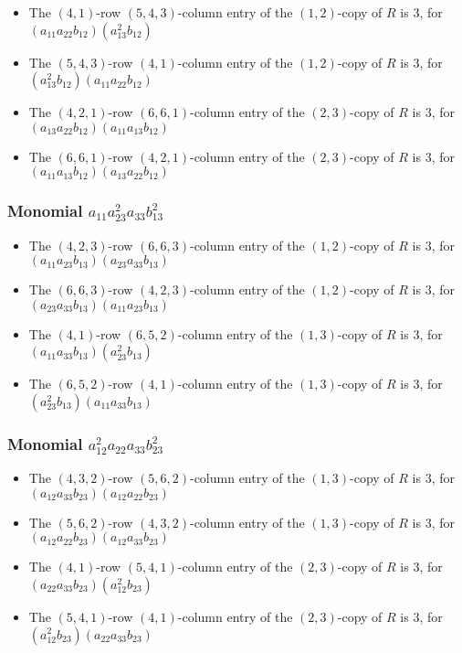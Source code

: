 \documentclass{article}
\begin{document}
\begin{itemize}
\item The $(4, 1)$-row $(5, 4, 3)$-column entry of the $ \left(1, 2\right) $-copy of $R$ is $ 3 $, for $( a_{11} a_{22} b_{12} )( a_{13}^{2} b_{12} )$ 
\item The $(5, 4, 3)$-row $(4, 1)$-column entry of the $ \left(1, 2\right) $-copy of $R$ is $ 3 $, for $( a_{13}^{2} b_{12} )( a_{11} a_{22} b_{12} )$ 
\item The $(4, 2, 1)$-row $(6, 6, 1)$-column entry of the $ \left(2, 3\right) $-copy of $R$ is $ 3 $, for $( a_{13} a_{22} b_{12} )( a_{11} a_{13} b_{12} )$ 
\item The $(6, 6, 1)$-row $(4, 2, 1)$-column entry of the $ \left(2, 3\right) $-copy of $R$ is $ 3 $, for $( a_{11} a_{13} b_{12} )( a_{13} a_{22} b_{12} )$ 
\end{itemize}
\subsubsection{Monomial $ a_{11} a_{23}^{2} a_{33} b_{13}^{2} $}

\begin{itemize}
\item The $(4, 2, 3)$-row $(6, 6, 3)$-column entry of the $ \left(1, 2\right) $-copy of $R$ is $ 3 $, for $( a_{11} a_{23} b_{13} )( a_{23} a_{33} b_{13} )$ 
\item The $(6, 6, 3)$-row $(4, 2, 3)$-column entry of the $ \left(1, 2\right) $-copy of $R$ is $ 3 $, for $( a_{23} a_{33} b_{13} )( a_{11} a_{23} b_{13} )$ 
\item The $(4, 1)$-row $(6, 5, 2)$-column entry of the $ \left(1, 3\right) $-copy of $R$ is $ 3 $, for $( a_{11} a_{33} b_{13} )( a_{23}^{2} b_{13} )$ 
\item The $(6, 5, 2)$-row $(4, 1)$-column entry of the $ \left(1, 3\right) $-copy of $R$ is $ 3 $, for $( a_{23}^{2} b_{13} )( a_{11} a_{33} b_{13} )$ 
\end{itemize}
\subsubsection{Monomial $ a_{12}^{2} a_{22} a_{33} b_{23}^{2} $}

\begin{itemize}
\item The $(4, 3, 2)$-row $(5, 6, 2)$-column entry of the $ \left(1, 3\right) $-copy of $R$ is $ 3 $, for $( a_{12} a_{33} b_{23} )( a_{12} a_{22} b_{23} )$ 
\item The $(5, 6, 2)$-row $(4, 3, 2)$-column entry of the $ \left(1, 3\right) $-copy of $R$ is $ 3 $, for $( a_{12} a_{22} b_{23} )( a_{12} a_{33} b_{23} )$ 
\item The $(4, 1)$-row $(5, 4, 1)$-column entry of the $ \left(2, 3\right) $-copy of $R$ is $ 3 $, for $( a_{22} a_{33} b_{23} )( a_{12}^{2} b_{23} )$ 
\item The $(5, 4, 1)$-row $(4, 1)$-column entry of the $ \left(2, 3\right) $-copy of $R$ is $ 3 $, for $( a_{12}^{2} b_{23} )( a_{22} a_{33} b_{23} )$ 
\end{itemize}
\end{document}
